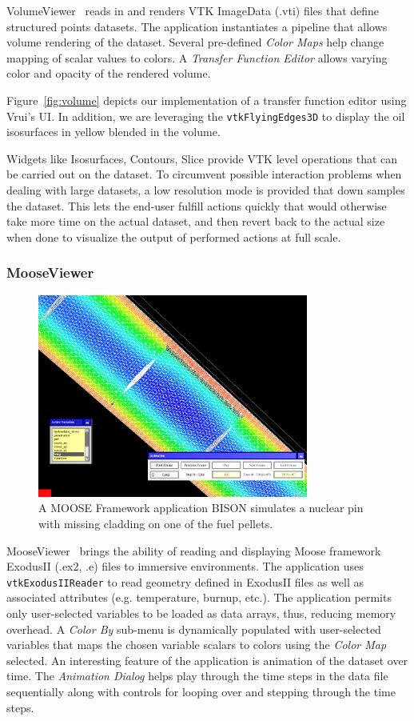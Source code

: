 VolumeViewer~\cite{VolumeViewer} reads in and renders VTK ImageData (.vti) files that define structured points datasets.  The application instantiates a pipeline that allows volume rendering of the dataset. Several pre-defined \textit{Color Maps} help change mapping of scalar values to colors. A  \textit{Transfer Function Editor} allows varying color and opacity of the rendered volume.

Figure~\ref{fig:volume} depicts our implementation of a transfer function editor using Vrui's UI. In addition, we are leveraging the \texttt{vtkFlyingEdges3D} to display the oil isosurfaces in yellow blended in the volume.

Widgets like Isosurfaces, Contours, Slice provide VTK level operations that can be carried out on the dataset. To circumvent possible interaction problems when dealing with large datasets, a low resolution mode is provided that down samples the dataset. This lets the end-user fulfill actions quickly that would otherwise take more time on the actual dataset, and then revert back to the actual size when done to visualize the output of performed actions at full scale.

\subsubsection{MooseViewer}

\begin{figure}[h!]
 \centering
 \includegraphics[width=3.5in]{images/fuelpin.png}
 \caption{A MOOSE Framework application BISON simulates a nuclear pin with missing cladding on one of the fuel pellets.}
 \label{fig:fuelpin}
\end{figure}

MooseViewer~\cite{MooseViewer} brings the ability of reading and displaying Moose framework~\cite{Gaston:2015, MooseFramework} ExodusII (.ex2, .e) files to immersive environments. The application uses \texttt{vtkExodusIIReader} to read geometry defined in ExodusII files as well as associated attributes (e.g. temperature, burnup, etc.). The application permits only user-selected variables to be loaded as data arrays, thus, reducing memory overhead. A \textit{Color By} sub-menu is dynamically populated with user-selected variables that maps the chosen variable scalars to colors using the \textit{Color Map} selected. An interesting feature of the application is animation of the dataset over time. The \textit{Animation Dialog} helps play through the time steps in the data file sequentially along with controls for looping over and stepping through the time steps.


